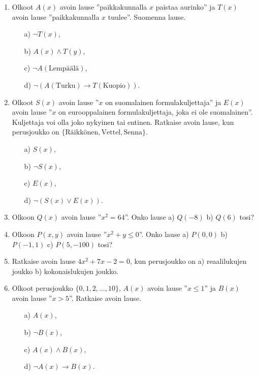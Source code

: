 \begin{enumerate}
\item
Olkoot $A(x)$ avoin lause ''paikkakunnalla $x$ paistaa
aurinko'' ja $T(x)$ avoin lause ''paikkakunnalla $x$
tuulee''. Suomenna lause.
\begin{itemize}
\item[a)] $\lnot T(x)$,
\item[b)] $A(x) \land T(y)$,
\item[c)] $\lnot A(\textrm{Lempäälä})$,
\item[d)] $\lnot (A(\textrm{Turku}) \to T(\textrm{Kuopio}))$.
\end{itemize}

\item
Olkoot $S(x)$ avoin lause ''$x$ on suomalainen
formulakuljettaja'' ja $E(x)$ avoin lause ''$x$ on
eurooppalainen formulakuljettaja, joka ei ole
suomalainen''. Kuljettaja voi olla joko nykyinen tai
entinen. Ratkaise avoin lause, kun perusjoukko on
$\{\textrm{Räikkönen}, \textrm{Vettel}, \textrm{Senna}\}$.
\begin{itemize}
\item[a)] $S(x)$,
\item[b)] $\lnot S(x)$,
\item[c)] $E(x)$,
\item[d)] $\lnot (S(x) \lor E(x))$.
\end{itemize}

\item
Olkoon $Q(x)$ avoin lause ''$x^2 = 64$''. Onko lause a)
$Q(-8)$ b) $Q(6)$ tosi?

\item
Olkoon $P(x, y)$ avoin lause ''$x^2 + y \le 0$''. Onko
lause a) $P(0, 0)$ b) $P(-1, 1)$ c) $P(5, -100)$ tosi?

\item
Ratkaise avoin lause $4x^2 + 7x - 2 = 0$, kun perusjoukko
on a) reaalilukujen joukko b) kokonaislukujen joukko.

\item
Olkoot perusjoukko $\{ 0, 1, 2, \ldots , 10\}$, $A(x)$
avoin lause ''$x \le 1$'' ja $B(x)$ avoin lause ''$x > 5$''.
Ratkaise avoin lause.
\begin{itemize}
\item[a)] $A(x)$,
\item[b)] $\lnot B(x)$,
\item[c)] $A(x) \land B(x)$,
\item[d)] $\lnot A(x) \to B(x)$.
\end{itemize}


\end{enumerate}
